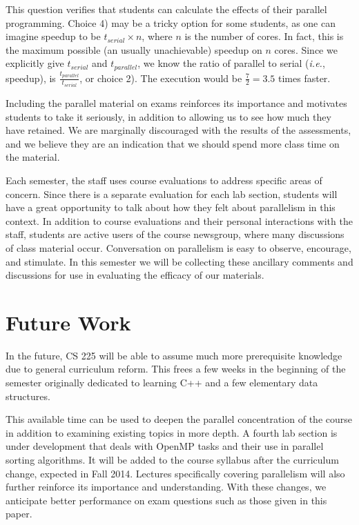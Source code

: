 \documentclass[conference]{./IEEEtran}
\begin{document}
This question verifies that students can calculate the effects of their parallel
programming. Choice 4) may be a tricky option for some students, as one can
imagine speedup to be $t_{serial}\times n$, where $n$ is the number of cores.
In fact, this is the maximum possible (an usually unachievable) speedup on $n$
cores. Since we explicitly give $t_{serial}$ and $t_{parallel}$, we know the
ratio of parallel to serial (\emph{i.e.}, speedup), is
$\frac{t_{parallel}}{t_{serial}}$, or choice 2). The execution would be
$\frac{7}{2} = 3.5$ times faster.

Including the parallel material on exams reinforces its importance and motivates
students to take it seriously, in addition to allowing us to see how much they
have retained.  We are marginally discouraged with the results of the
assessments, and we believe they are an indication that we should spend more
class time on the material.

Each semester, the staff uses course evaluations to address specific areas of
concern. Since there is a separate evaluation for each lab section, students
will have a great opportunity to talk about how they felt about parallelism in
this context. In addition to course evaluations and their personal interactions
with the staff, students are active users of the course newsgroup, where many
discussions of class material occur. Conversation on parallelism is easy to
observe, encourage, and stimulate.  In this semester we will be collecting these
ancillary comments and discussions for use in evaluating the efficacy of our
materials.

\section{Future Work}

In the future, CS 225 will be able to assume much more prerequisite knowledge
due to general curriculum reform. This frees a few weeks in the beginning of the
semester originally dedicated to learning C++ and a few elementary data
structures.

This available time can be used to deepen the parallel concentration of the
course in addition to examining existing topics in more depth. A fourth lab
section is under development that deals with OpenMP tasks and their use in
parallel sorting algorithms. It will be added to the course syllabus after the
curriculum change, expected in Fall 2014. Lectures specifically covering
parallelism will also further reinforce its importance and understanding. With
these changes, we anticipate better performance on exam questions such as those
given in this paper.
\end{document}
